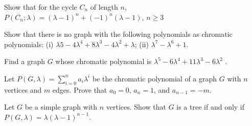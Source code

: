 \documentclass[twoside]{article}
\begin{document}
\newpage

\begin{ejercicio}{3.6}
Show that for the cycle $C_n$ of length $n$, $P(C_n; λ) = (λ − 1)^n + (−1)^n
(λ − 1)$, $n ≥ 3$
\end{ejercicio}
\begin{solucion}
 


%
\end{solucion}

\newpage

\begin{ejercicio}{3.7}
Show that there is no graph with the following polynomials as chromatic polynomials:
(i) $λ
5 − 4λ^4 + 8λ^3 − 4λ^2 + λ$; (ii) $λ^7 − λ^6 + 1$.
\end{ejercicio}
\begin{solucion}

\end{solucion}

\newpage

\begin{ejercicio}{3.8}
Find a graph $G$ whose chromatic polynomial is $λ^5 − 6λ^4 + 11λ^3 − 6λ^2$
.
\end{ejercicio}
\begin{solucion}





\end{solucion}
\newpage

\begin{ejercicio}{3.9}
Let $P(G, λ) = \sum^n_{i=0} a_iλ^i$ be the chromatic polynomial of a graph $G$ with $n$ vertices and
$m$ edges. Prove that $a_0 = 0$, $a_n = 1$, and $a_{n−1} = −m$.
\end{ejercicio}
\begin{solucion}

\end{solucion}

\newpage

\begin{ejercicio}{3.10}
Let $G$ be a simple graph with $n$ vertices. Show that $G$ is a tree if and only if $P(G, λ) =
λ(λ − 1)^{n−1}$.

\end{ejercicio}
\begin{solucion}
\end{solucion}
\end{document}
